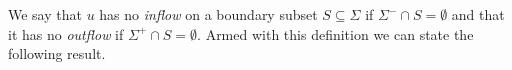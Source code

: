 We say that $u$ has no \emph{inflow} on a boundary subset $S\subseteq\Sigma$ if $\Sigma^-\cap S=\emptyset$ and
that it has no \emph{outflow} if $\Sigma^+\cap S=\emptyset$.
Armed with this definition we can state the following result.

